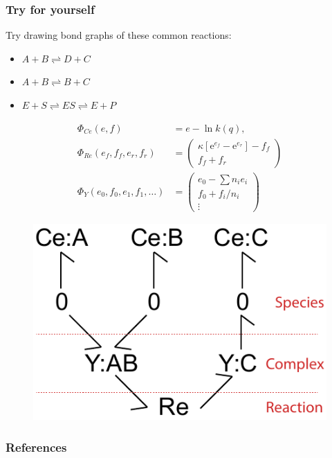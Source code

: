 \documentclass[10pt,reqno]{beamer}
\newcommand{\e}{\mathrm{e}}
\begin{document}
\begin{frame}
\frametitle{Try for yourself}
Try drawing bond graphs of these common reactions:
\begin{itemize}
	\item $A+B \rightleftharpoons D+C$
	\item $A+B \rightleftharpoons B+C$
	\item $E + S \rightleftharpoons ES \rightleftharpoons E+P$
\end{itemize}
\vfill
{\scriptsize
	\begin{minipage}{0.475\textwidth}
		\begin{align*}
		\Phi_{Ce}(e,f) &= e - \ln k(q),\\
		\Phi_{Re}(e_f,f_f,e_r,f_r) &= \left(
		\begin{matrix}
		\kappa\left[\e^{e_f} - \e^{e_r}\right] - f_f\\
		f_f +  f_r
		\end{matrix}
		\right)\\
		\Phi_{Y}(e_0,f_0, e_1,f_1,\ldots) &= \left(\begin{matrix}
		e_0 - \sum n_ie_i \\
		f_0 + f_i/n_i\\
		\vdots
		\end{matrix}\right)
		\end{align*}
	\end{minipage}
\begin{minipage}{0.475\textwidth}
	\raggedright
	\begin{figure}
	\includegraphics[width=0.75\linewidth]{images/bondgraph_abc}
	\end{figure}
\end{minipage}
	

}
\end{frame}
\begin{frame}
\frametitle{References}
\printbibliography
\end{frame}
\end{document}
